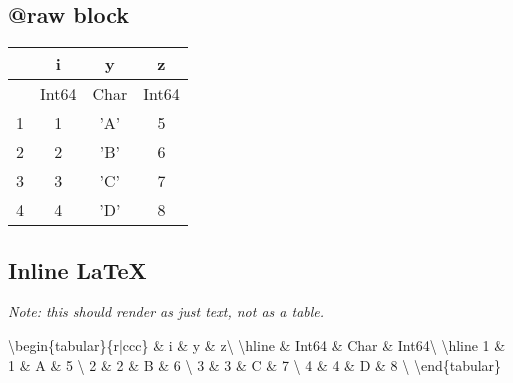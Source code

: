 \begin{table}[h]
\centering
{}\end{table}


\subsection{@raw block}



\label{12968435574917214693}{}



\begin{tabular}{r|ccc}
        & i & y & z\\
        \hline
        & Int64 & Char & Int64\\
        \hline
        1 & 1 & 'A' & 5 \\
        2 & 2 & 'B' & 6 \\
        3 & 3 & 'C' & 7 \\
        4 & 4 & 'D' & 8 \\
\end{tabular}



\subsection{Inline LaTeX}



\label{7647595013011656041}{}


\emph{Note: this should render as just text, not as a table.}



{\textbackslash}begin\{tabular\}\{r|ccc\}         \& i \& y \& z{\textbackslash}
        {\textbackslash}hline         \& Int64 \& Char \& Int64{\textbackslash}
        {\textbackslash}hline         1 \& 1 \& {\textquotesingle}A{\textquotesingle} \& 5 {\textbackslash}
        2 \& 2 \& {\textquotesingle}B{\textquotesingle} \& 6 {\textbackslash}
        3 \& 3 \& {\textquotesingle}C{\textquotesingle} \& 7 {\textbackslash}
        4 \& 4 \& {\textquotesingle}D{\textquotesingle} \& 8 {\textbackslash}
{\textbackslash}end\{tabular\}




